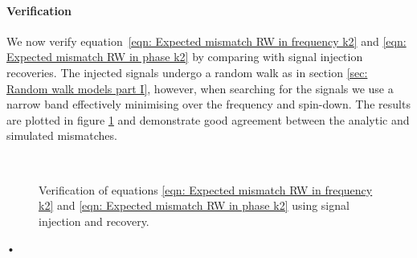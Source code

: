 \paragraph{Verification}

We now verify equation~\eqref{eqn: Expected mismatch RW in frequency k2} and
\eqref{eqn: Expected mismatch RW in phase k2} by comparing with signal
injection recoveries. The injected signals undergo a random walk as in section
\ref{sec: Random walk models part I}, however, when searching for the signals we 
use a narrow band effectively minimising over the frequency and spin-down. The 
results are plotted in figure \ref{fig: verification of minimised RW} and 
demonstrate good agreement between the analytic and simulated mismatches.

\begin{figure}[ht]
\centering
{} 
\\
\caption{Verification of equations \eqref{eqn: Expected mismatch RW in
frequency k2} and \eqref{eqn: Expected mismatch RW in phase k2} using signal
injection and recovery.}
\label{fig: verification of minimised RW}
\end{figure}•
\FloatBarrier
